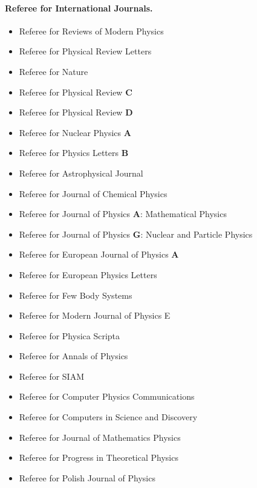 \documentclass[%
oneside,                 %
final,                   %
10pt]{article}
\begin{document}
\paragraph{Referee for International Journals.}
\begin{itemize}
\item Referee for Reviews of Modern Physics

\item Referee for Physical Review Letters

\item Referee for Nature

\item Referee for Physical Review \textbf{C}

\item Referee for Physical Review \textbf{D}

\item Referee for Nuclear Physics \textbf{A}

\item Referee for Physics Letters \textbf{B}

\item Referee for Astrophysical Journal

\item Referee for Journal of Chemical Physics

\item Referee for Journal of Physics \textbf{A}: Mathematical Physics

\item Referee for Journal of Physics \textbf{G}: Nuclear and Particle Physics

\item Referee for European Journal of Physics \textbf{A}

\item Referee for European Physics Letters

\item Referee for Few Body Systems

\item Referee for Modern Journal of Physics E

\item Referee for Physica Scripta

\item Referee for Annals of Physics

\item Referee for SIAM

\item Referee for Computer Physics Communications

\item Referee for Computers in Science and Discovery

\item Referee for Journal of Mathematics Physics

\item Referee for Progress in Theoretical Physics

\item Referee for Polish Journal of Physics
\end{itemize}
\end{document}
